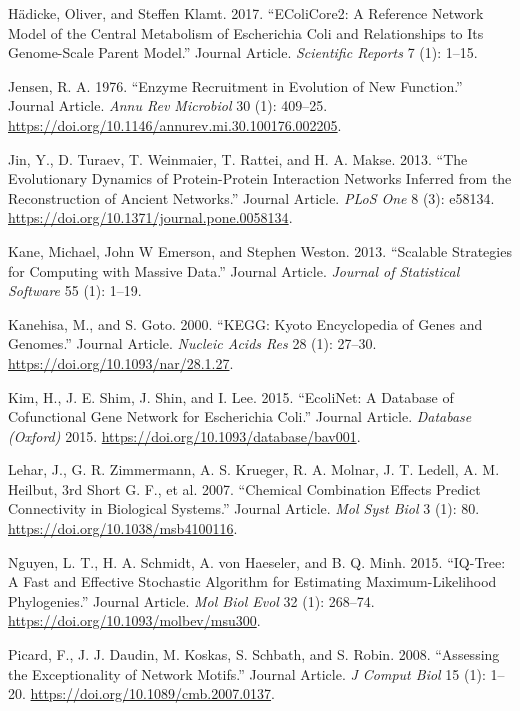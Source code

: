 \documentclass[]{elsarticle} %
\begin{document}
\leavevmode\hypertarget{ref-Hadicke2017}{}%
Hädicke, Oliver, and Steffen Klamt. 2017. ``EColiCore2: A Reference Network Model of the Central Metabolism of Escherichia Coli and Relationships to Its Genome-Scale Parent Model.'' Journal Article. \emph{Scientific Reports} 7 (1): 1--15.

\leavevmode\hypertarget{ref-Jensen1976}{}%
Jensen, R. A. 1976. ``Enzyme Recruitment in Evolution of New Function.'' Journal Article. \emph{Annu Rev Microbiol} 30 (1): 409--25. \url{https://doi.org/10.1146/annurev.mi.30.100176.002205}.

\leavevmode\hypertarget{ref-Jin2013}{}%
Jin, Y., D. Turaev, T. Weinmaier, T. Rattei, and H. A. Makse. 2013. ``The Evolutionary Dynamics of Protein-Protein Interaction Networks Inferred from the Reconstruction of Ancient Networks.'' Journal Article. \emph{PLoS One} 8 (3): e58134. \url{https://doi.org/10.1371/journal.pone.0058134}.

\leavevmode\hypertarget{ref-Kane2013}{}%
Kane, Michael, John W Emerson, and Stephen Weston. 2013. ``Scalable Strategies for Computing with Massive Data.'' Journal Article. \emph{Journal of Statistical Software} 55 (1): 1--19.

\leavevmode\hypertarget{ref-Kanehisa2000}{}%
Kanehisa, M., and S. Goto. 2000. ``KEGG: Kyoto Encyclopedia of Genes and Genomes.'' Journal Article. \emph{Nucleic Acids Res} 28 (1): 27--30. \url{https://doi.org/10.1093/nar/28.1.27}.

\leavevmode\hypertarget{ref-Kim2015}{}%
Kim, H., J. E. Shim, J. Shin, and I. Lee. 2015. ``EcoliNet: A Database of Cofunctional Gene Network for Escherichia Coli.'' Journal Article. \emph{Database (Oxford)} 2015. \url{https://doi.org/10.1093/database/bav001}.

\leavevmode\hypertarget{ref-Lehar2007}{}%
Lehar, J., G. R. Zimmermann, A. S. Krueger, R. A. Molnar, J. T. Ledell, A. M. Heilbut, 3rd Short G. F., et al. 2007. ``Chemical Combination Effects Predict Connectivity in Biological Systems.'' Journal Article. \emph{Mol Syst Biol} 3 (1): 80. \url{https://doi.org/10.1038/msb4100116}.

\leavevmode\hypertarget{ref-Nguyen2015}{}%
Nguyen, L. T., H. A. Schmidt, A. von Haeseler, and B. Q. Minh. 2015. ``IQ-Tree: A Fast and Effective Stochastic Algorithm for Estimating Maximum-Likelihood Phylogenies.'' Journal Article. \emph{Mol Biol Evol} 32 (1): 268--74. \url{https://doi.org/10.1093/molbev/msu300}.

\leavevmode\hypertarget{ref-Picard2008}{}%
Picard, F., J. J. Daudin, M. Koskas, S. Schbath, and S. Robin. 2008. ``Assessing the Exceptionality of Network Motifs.'' Journal Article. \emph{J Comput Biol} 15 (1): 1--20. \url{https://doi.org/10.1089/cmb.2007.0137}.
\end{document}
